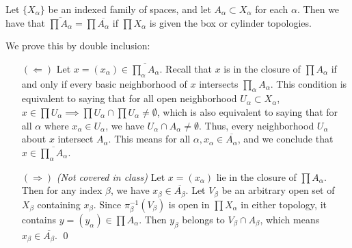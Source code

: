 \newpage
\begin{simpleclaim}
    Let $\{X_\alpha\}$ be an indexed family of spaces, and let $A_\alpha \subset X_\alpha$ for each $\alpha$. Then we have that $\overline{\prod A_\alpha} = \prod \overline{A_\alpha}$ if $\prod X_\alpha$ is given the box or cylinder topologies.
\end{simpleclaim}
\noindent We prove this by double inclusion:
\begin{itemize}
    \item[$(\Leftarrow)$] Let $x = (x_\alpha) \in \overline{\prod_\alpha A_\alpha}$. Recall that $x$ is in the closure of $\prod A_\alpha$ if and only if every basic neighborhood of $x$ intersects $\prod_\alpha A_\alpha$. This condition is equivalent to saying that for all open neighborhood $U_\alpha \subset X_\alpha$, $x \in \prod U_\alpha \implies \prod U_\alpha \cap \prod U_\alpha \neq \emptyset$, which is also equivalent to saying that for all $\alpha$ where $x_\alpha \in U_\alpha$, we have $U_\alpha \cap A_\alpha \neq \emptyset$. Thus, every neighborhood $U_\alpha$ about $x$ intersect $A_\alpha$. This means for all $\alpha, x_\alpha \in \overline{A_\alpha}$, and we conclude that $x \in \overline{\prod_\alpha A_\alpha}$.
    \item[$(\Rightarrow)$] \textit{(Not covered in class)} Let $x = (x_\alpha)$ lie in the closure of $\prod A_\alpha$. Then for any index $\beta$, we have $x_\beta \in \overline{A_\beta}$. Let $V_\beta$ be an arbitrary open set of $X_\beta$ containing $x_\beta$. Since $\pi_\beta^{-1}(V_\beta)$ is open in $\prod X_\alpha$ in either topology, it contains $y = (y_\alpha) \in \prod A_\alpha$. Then $y_\beta$ belongs to $V_\beta \cap A_\beta$, which means $x_\beta \in \overline{A_\beta}$. \qed
\end{itemize}

